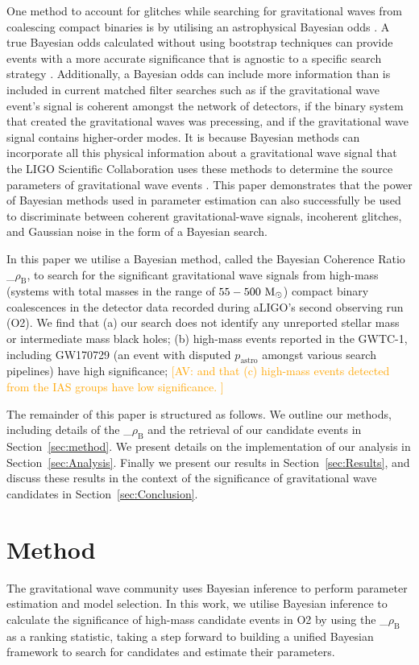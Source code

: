 \documentclass[%
 amsmath,amssymb,
 aps,
twocolumn
]{revtex4}
\newcommand{\mathcmd}[1]{{\sc \relax\ifmmode#1\else $#1$\fi}\xspace}
\newcommand{\bcr}{\mathcmd{\rho_\text{B}}}
\newcommand{\msun}{\mathcmd{\text{M}_\odot}}
\newcommand{\pastro}{\relax\ifmmode{p_\text{astro}}\else $p_\text{astro}$\fi\xspace}
\newcommand{\av}[1]{\textcolor{orange}{[AV: #1]}}
\begin{document}
One method to account for glitches while searching for gravitational waves from coalescing compact binaries is by utilising an astrophysical Bayesian odds  \cite{bci, BCR1, BCR2, bcr_gw151216, bayesian_odds}. A true Bayesian odds calculated without using bootstrap techniques can provide events with a more accurate significance that is agnostic to a specific search strategy \cite{BCR2, bcr_gw151216,  bayesian_odds}. Additionally, a Bayesian odds can include more information than is included in current matched filter searches such as if the gravitational wave event's signal is coherent amongst the network of detectors, if the binary system that created the gravitational waves was precessing, and if the gravitational wave signal contains higher-order modes.  It is because Bayesian methods can incorporate all this physical information about a gravitational wave signal that the LIGO Scientific Collaboration uses these methods to determine the source parameters of gravitational wave events \cite{abbott2016ligo, abbott2019gwtc}. This paper demonstrates that the power of Bayesian methods used in parameter estimation can also successfully be used to discriminate between coherent gravitational-wave signals, incoherent glitches, and Gaussian noise in the form of a Bayesian search. 

In this paper we utilise a Bayesian method, called the Bayesian Coherence Ratio \bcr \cite{BCR1}, to search for the significant gravitational wave signals from high-mass (systems with total masses in the range of $55-500\ \msun$) compact binary coalescences in the detector data recorded during aLIGO's second observing run (O2).  We find that (a) our search does not identify any unreported stellar mass or intermediate mass black holes; (b) high-mass events reported in the GWTC-1, including GW170729 (an event with disputed \pastro amongst various search pipelines) have high significance; \av{and that (c) high-mass events detected from the IAS groups have low significance. }

The remainder of this paper is structured as follows. We outline our methods, including details of the \bcr and the retrieval of our candidate events in Section~\ref{sec:method}. We present details on the implementation of our analysis in Section~\ref{sec:Analysis}. Finally we present our results in Section~\ref{sec:Results}, and discuss these results in the context of the significance of gravitational wave candidates in Section~\ref{sec:Conclusion}.


\section{Method\label{sec:method}}
The gravitational wave community uses Bayesian inference to perform parameter estimation and model selection. In this work, we utilise Bayesian inference to calculate the significance of high-mass candidate events in O2 by using the \bcr as a ranking statistic, taking a step forward to building a unified Bayesian framework to search for candidates and estimate their parameters.
\end{document}

